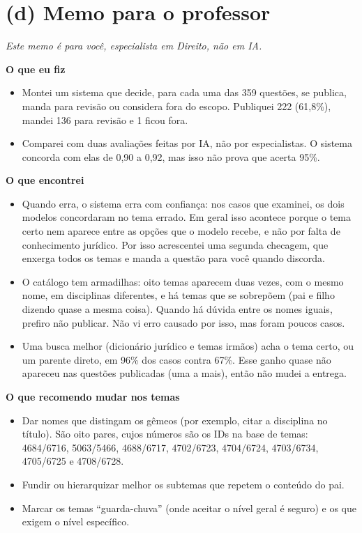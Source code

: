 \documentclass[11pt,a4paper]{article}
\newcommand{\bd}[1]{\textbf{#1}}
\begin{document}
\clearpage
\section*{(d) Memo para o professor}
{\small\itshape Este memo é para você, especialista em Direito, não em IA.}

\bd{O que eu fiz}
\begin{itemize}
\item Montei um sistema que decide, para cada uma das 359 questões, se publica, manda para
      revisão ou considera fora do escopo. Publiquei 222 (61,8\%), mandei 136 para revisão e 1
      ficou fora.
\item Comparei com duas avaliações feitas por IA, não por especialistas. O sistema concorda
      com elas de 0,90 a 0,92, mas isso não prova que acerta 95\%.
\end{itemize}

\bd{O que encontrei}
\begin{itemize}
\item Quando erra, o sistema erra com confiança: nos casos que examinei, os dois modelos
      concordaram no tema errado. Em geral isso acontece porque o tema certo nem aparece entre
      as opções que o modelo recebe, e não por falta de conhecimento jurídico. Por isso
      acrescentei uma segunda checagem, que enxerga todos os temas e manda a questão para você
      quando discorda.
\item O catálogo tem armadilhas: oito temas aparecem duas vezes, com o mesmo nome, em
      disciplinas diferentes, e há temas que se sobrepõem (pai e filho dizendo quase a mesma
      coisa). Quando há dúvida entre os nomes iguais, prefiro não publicar. Não vi erro causado
      por isso, mas foram poucos casos.
\item Uma busca melhor (dicionário jurídico e temas irmãos) acha o tema certo, ou um parente
      direto, em 96\% dos casos contra 67\%. Esse ganho quase não apareceu nas questões
      publicadas (uma a mais), então não mudei a entrega.
\end{itemize}

\bd{O que recomendo mudar nos temas}
\begin{itemize}
\item Dar nomes que distingam os gêmeos (por exemplo, citar a disciplina no título). São oito
      pares, cujos números são os IDs na base de temas: 4684/6716, 5063/5466, 4688/6717,
      4702/6723, 4704/6724, 4703/6734, 4705/6725 e 4708/6728.
\item Fundir ou hierarquizar melhor os subtemas que repetem o conteúdo do pai.
\item Marcar os temas ``guarda-chuva'' (onde aceitar o nível geral é seguro) e os que exigem o
      nível específico.
\end{itemize}
\end{document}

